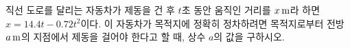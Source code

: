 직선 도로를 달리는 자동차가 제동을 건 후 $t$초 동안 움직인 거리를 $x\mkern3mu \mathrm{m}$라 하면 $x=14.4t-0.72t^2$이다. 이 자동차가 목적지에 정확히 정차하려면 목적지로부터 전방 $a\mkern3mu \mathrm{m}$의 지점에서 제동을 걸어야 한다고 할 때, 상수 $a$의 값을 구하시오.
